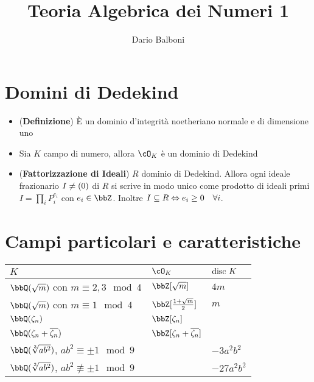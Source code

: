 \documentclass[a4paper, 11pt]{article}
\author{Dario Balboni}
\date{}
\title{Teoria Algebrica dei Numeri 1}
\begin{document}
\maketitle
\setcounter{tocdepth}{3}
\tableofcontents

\setlength{\parindent}{0em}
\setlength{\parskip}{1em}
\linespread{1.2}

\section{Domini di Dedekind}
\label{sec-1}
\begin{itemize}
\item (\textbf{Definizione}) È un dominio d'integrità noetheriano normale e di dimensione uno
\item Sia $K$ campo di numero, allora $\cO_K$ è un dominio di Dedekind
\item (\textbf{Fattorizzazione di Ideali}) $R$ dominio di Dedekind. Allora ogni ideale frazionario $I \neq \left({0}\right)$ di $R$ si scrive in modo unico come prodotto di ideali primi $I = \prod_i P_i^{e_i}$ con $e_i \in \bbZ$.
Inoltre $I \subseteq R \Leftrightarrow e_i \ge 0 \quad \forall i$.
\end{itemize}

\section{Campi particolari e caratteristiche}
\label{sec-2}

\begin{table}[htb]
\centering
\begin{tabular}{lll}
$K$ & $\cO_K$ & $\text{disc } K$\\
\hline
$\bbQ(\sqrt{m})$ con $m \equiv 2, 3 \mod 4$ & $\bbZ[\sqrt{m}]$ & $4m$\\
$\bbQ(\sqrt{m})$ con $m \equiv 1 \mod 4$ & $\bbZ[\frac{1 + \sqrt{m}}{2}]$ & $m$\\
$\bbQ(\zeta_n)$ & $\bbZ[\zeta_n]$ & \\
$\bbQ(\zeta_n + \overline{\zeta_n})$ & $\bbZ[\zeta_n + \overline{\zeta_n}]$ & \\
$\bbQ(\sqrt[3]{ab^2})$, $ab^2 \equiv \pm 1 \mod 9$ &  & $-3a^2b^2$\\
$\bbQ(\sqrt[3]{ab^2})$, $ab^2 \not\equiv \pm 1 \mod 9$ &  & $-27a^2b^2$\\
\end{tabular}
\end{table}
\end{document}
